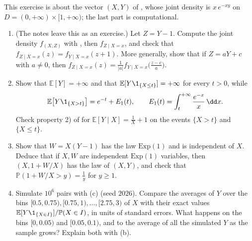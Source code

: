 \begin{exercise}\label{ex:cp-heavy-tail}
\medium This exercise is about the vector $(X,Y)$ of , whose
joint density is $x\,e^{-xy}$ on $D=(0,+\infty)\times[1,+\infty)$; the last part is computational.
\begin{enumerate}[label=(\alph*)]
  \item (The notes leave this as an exercise.) Let $Z=Y-1$. Compute the joint density $f_{(X,Z)}$
    with , then $f_{Z\mid X=x}$, and check that
    $f_{Z\mid X=x}(z)=f_{Y\mid X=x}(z+1)$. More generally, show that if $Z=aY+c$ with $a\ne0$, then
    $f_{Z\mid X=x}(z)=\frac1{|a|}f_{Y\mid X=x}\big(\frac{z-c}a\big)$.
  \item Show that $\mathbb E[Y]=+\infty$ and that $\mathbb E[Y\1_{\{X\le t\}}]=+\infty$ for every
    $t>0$, while
    \[
      \mathbb E\big[Y\1_{\{X>t\}}\big]=e^{-t}+E_1(t),\qquad E_1(t)=\int_t^{+\infty}\frac{e^{-x}}x\,\dd x .
    \]
    Check property 2) of  for $\mathbb E[Y\mid X]=\frac1X+1$
    on the events $\{X>t\}$ and $\{X\le t\}$.
  \item Show that $W=X(Y-1)$ has the law $\mathrm{Exp}(1)$ and is independent of $X$. Deduce that if
    $X,W$ are independent $\mathrm{Exp}(1)$ variables, then $(X,1+W/X)$ has the law of $(X,Y)$, and
    check that $\mathbb P(1+W/X>y)=\frac1y$ for $y\ge1$.
  \item Simulate $10^6$ pairs with (c) (seed $2026$). Compare the averages of $Y$ over the bins
    $[0.5,0.75),[0.75,1),\dots,[2.75,3)$ of $X$ with their exact values
    $\mathbb E[Y\1_{\{X\in I\}}]/\mathbb P(X\in I)$, in units of standard errors. What happens on the
    bins $[0,0.05)$ and $[0.05,0.1)$, and to the average of all the simulated $Y$ as the sample grows?
    Explain both with (b).
\end{enumerate}
\end{exercise}

